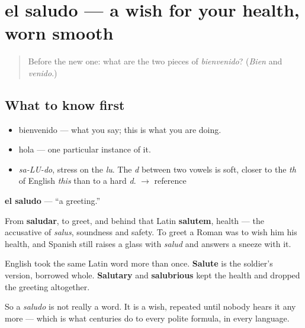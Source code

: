 \section[el saludo]{el saludo — a wish for your health, worn smooth}

\label{lesson:ES-C282-saludo}



\begin{quote}
Before the new one: what are the two pieces of \emph{bienvenido}? (\emph{Bien} and \emph{venido}.)
\end{quote}

\subsection*{What to know first}
\begin{itemize}
\raggedright
  \item bienvenido — what you say; this is what you are doing.
  \item hola — one particular instance of it.
\end{itemize}

\begin{sounds}
\begin{itemize}
\raggedright
  \item \emph{sa-LU-do}, stress on the \emph{lu}. The \emph{d} between two vowels is soft, closer to the \emph{th} of English \emph{this} than to a hard \emph{d}. $\to$ reference
\end{itemize}
\end{sounds}

\begin{cousinweb}
\textbf{el saludo} — \textquotedblleft{}a greeting.\textquotedblright{}

From \textbf{saludar}, to greet, and behind that Latin \textbf{salutem}, health — the accusative of \emph{salus}, soundness and safety. To greet a Roman was to wish him his health, and Spanish still raises a glass with \emph{salud} and answers a sneeze with it.

English took the same Latin word more than once. \textbf{Salute} is the soldier's version, borrowed whole. \textbf{Salutary} and \textbf{salubrious} kept the health and dropped the greeting altogether.

So a \emph{saludo} is not really a word. It is a wish, repeated until nobody hears it any more — which is what centuries do to every polite formula, in every language.
\end{cousinweb}

